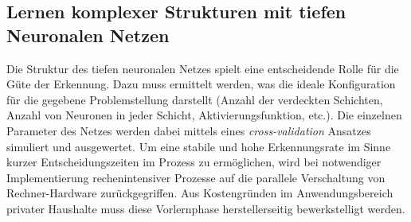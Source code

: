 \subsection{Lernen komplexer Strukturen mit tiefen Neuronalen Netzen}
Die Struktur des tiefen neuronalen Netzes spielt eine entscheidende Rolle für die Güte der Erkennung. Dazu muss ermittelt werden, was die ideale Konfiguration für die gegebene Problemstellung darstellt (Anzahl der verdeckten Schichten, Anzahl von Neuronen in jeder Schicht, Aktivierungsfunktion, etc.). Die einzelnen Parameter des Netzes werden dabei mittels eines \textit{cross-validation} Ansatzes simuliert und ausgewertet. Um eine stabile und hohe Erkennungsrate im Sinne kurzer Entscheidungszeiten im Prozess zu ermöglichen, wird bei notwendiger Implementierung rechenintensiver Prozesse auf die parallele Verschaltung von Rechner-Hardware zurückgegriffen. Aus Kostengründen im Anwendungsbereich privater Haushalte muss diese Vorlernphase herstellerseitig bewerkstelligt werden.

